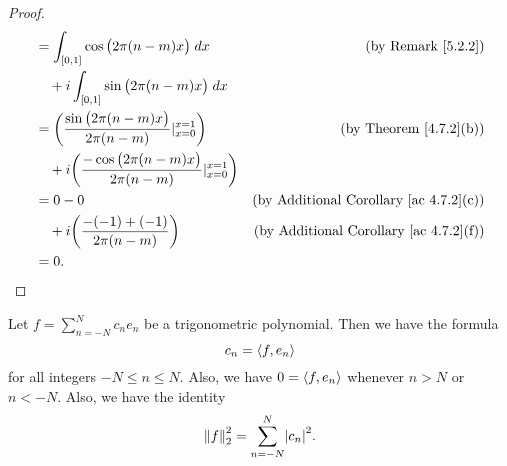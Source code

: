 \begin{proof}
\begin{align*}
         & = \int_{[0, 1]} \cos\big(2 \pi (n - m) x\big) \; dx                                         & \text{(by Remark \ref{5.2.2})}                     \\
         & \quad + i \int_{[0, 1]} \sin\big(2 \pi (n - m) x\big) \; dx                                                                                      \\
         & = \bigg(\frac{\sin\big(2 \pi (n - m) x\big)}{2 \pi (n - m)}|_{x = 0}^{x = 1}\bigg)          & \text{(by Theorem \ref{4.7.2}(b))}                 \\
         & \quad + i \bigg(\frac{-\cos\big(2 \pi (n - m) x\big)}{2 \pi (n - m)}|_{x = 0}^{x = 1}\bigg)                                                      \\
         & = 0 - 0                                                                                     & \text{(by Additional Corollary \ref{ac 4.7.2}(c))} \\
         & \quad + i \bigg(\frac{- (-1) + (-1)}{2 \pi (n - m)}\bigg)                                   & \text{(by Additional Corollary \ref{ac 4.7.2}(f))} \\
         & = 0.
    \end{align*}
\end{proof}

\begin{corollary}\label{5.3.6}
    Let \(f = \sum_{n = -N}^N c_n e_n\) be a trigonometric polynomial.
    Then we have the formula
    \[
        c_n = \inner*{f, e_n}
    \]
    for all integers \(-N \leq n \leq N\).
    Also, we have \(0 = \inner*{f, e_n}\) whenever \(n > N\) or \(n < -N\).
    Also, we have the identity
    \[
        \norm*{f}_2^2 = \sum_{n = -N}^N \abs{c_n}^2.
    \]
\end{corollary}

